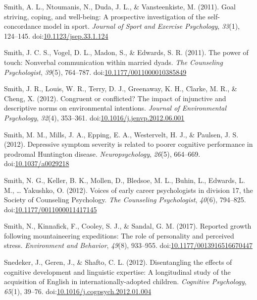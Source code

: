 \documentclass[english,man]{apa6}
\theoremstyle{definition}
\theoremstyle{definition}
\theoremstyle{definition}
\theoremstyle{remark}
\begin{document}
\hypertarget{ref-Smith2011a}{}
Smith, A. L., Ntoumanis, N., Duda, J. L., \& Vansteenkiste, M. (2011).
Goal striving, coping, and well-being: A prospective investigation of
the self-concordance model in sport. \emph{Journal of Sport and Exercise
Psychology}, \emph{33}(1), 124--145.
doi:\href{https://doi.org/10.1123/jsep.33.1.124}{10.1123/jsep.33.1.124}

\hypertarget{ref-Smith2011}{}
Smith, J. C. S., Vogel, D. L., Madon, S., \& Edwards, S. R. (2011). The
power of touch: Nonverbal communication within married dyads. \emph{The
Counseling Psychologist}, \emph{39}(5), 764--787.
doi:\href{https://doi.org/10.1177/0011000010385849}{10.1177/0011000010385849}

\hypertarget{ref-Smith2012b}{}
Smith, J. R., Louis, W. R., Terry, D. J., Greenaway, K. H., Clarke, M.
R., \& Cheng, X. (2012). Congruent or conflicted? The impact of
injunctive and descriptive norms on environmental intentions.
\emph{Journal of Environmental Psychology}, \emph{32}(4), 353--361.
doi:\href{https://doi.org/10.1016/j.jenvp.2012.06.001}{10.1016/j.jenvp.2012.06.001}

\hypertarget{ref-Smith2012a}{}
Smith, M. M., Mills, J. A., Epping, E. A., Westervelt, H. J., \&
Paulsen, J. S. (2012). Depressive symptom severity is related to poorer
cognitive performance in prodromal Huntington disease.
\emph{Neuropsychology}, \emph{26}(5), 664--669.
doi:\href{https://doi.org/10.1037/a0029218}{10.1037/a0029218}

\hypertarget{ref-Smith2012}{}
Smith, N. G., Keller, B. K., Mollen, D., Bledsoe, M. L., Buhin, L.,
Edwards, L. M., \ldots{} Yakushko, O. (2012). Voices of early career
psychologists in division 17, the Society of Counseling Psychology.
\emph{The Counseling Psychologist}, \emph{40}(6), 794--825.
doi:\href{https://doi.org/10.1177/0011000011417145}{10.1177/0011000011417145}

\hypertarget{ref-Smith2017}{}
Smith, N., Kinnafick, F., Cooley, S. J., \& Sandal, G. M. (2017).
Reported growth following mountaineering expeditions: The role of
personality and perceived stress. \emph{Environment and Behavior},
\emph{49}(8), 933--955.
doi:\href{https://doi.org/10.1177/0013916516670447}{10.1177/0013916516670447}

\hypertarget{ref-Snedeker2012}{}
Snedeker, J., Geren, J., \& Shafto, C. L. (2012). Disentangling the
effects of cognitive development and linguistic expertise: A
longitudinal study of the acquisition of English in
internationally-adopted children. \emph{Cognitive Psychology},
\emph{65}(1), 39--76.
doi:\href{https://doi.org/10.1016/j.cogpsych.2012.01.004}{10.1016/j.cogpsych.2012.01.004}
\end{document}
